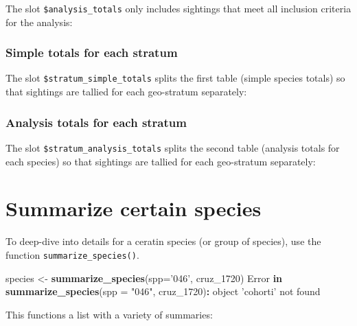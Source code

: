 \documentclass[
]{book}
\newenvironment{Shaded}{\begin{snugshade}}{\end{snugshade}}
\newcommand{\ControlFlowTok}[1]{\textcolor[rgb]{0.13,0.29,0.53}{\textbf{#1}}}
\newcommand{\DataTypeTok}[1]{\textcolor[rgb]{0.13,0.29,0.53}{#1}}
\newcommand{\DecValTok}[1]{\textcolor[rgb]{0.00,0.00,0.81}{#1}}
\newcommand{\KeywordTok}[1]{\textcolor[rgb]{0.13,0.29,0.53}{\textbf{#1}}}
\newcommand{\NormalTok}[1]{#1}
\newcommand{\OperatorTok}[1]{\textcolor[rgb]{0.81,0.36,0.00}{\textbf{#1}}}
\newcommand{\StringTok}[1]{\textcolor[rgb]{0.31,0.60,0.02}{#1}}
\begin{document}
The slot \texttt{\$analysis\_totals} only includes sightings that meet all inclusion criteria for the analysis:

\hypertarget{simple-totals-for-each-stratum}{%
\subsubsection*{Simple totals for each stratum}\label{simple-totals-for-each-stratum}}

The slot \texttt{\$stratum\_simple\_totals} splits the first table (simple species totals) so that sightings are tallied for each geo-stratum separately:

\hypertarget{analysis-totals-for-each-stratum}{%
\subsubsection*{Analysis totals for each stratum}\label{analysis-totals-for-each-stratum}}

The slot \texttt{\$stratum\_analysis\_totals} splits the second table (analysis totals for each species) so that sightings are tallied for each geo-stratum separately:

\hypertarget{summarize-certain-species}{%
\section*{Summarize certain species}\label{summarize-certain-species}}

To deep-dive into details for a ceratin species (or group of species), use the function \texttt{summarize\_species()}.

\begin{Shaded}
\begin{Highlighting}[]
\NormalTok{species <-}\StringTok{ }\KeywordTok{summarize_species}\NormalTok{(}\DataTypeTok{spp=}\StringTok{'046'}\NormalTok{, cruz_}\DecValTok{1720}\NormalTok{)}
\NormalTok{Error }\ControlFlowTok{in} \KeywordTok{summarize_species}\NormalTok{(}\DataTypeTok{spp =} \StringTok{"046"}\NormalTok{, cruz_}\DecValTok{1720}\NormalTok{)}\OperatorTok{:}\StringTok{ }\NormalTok{object }\StringTok{'cohorti'}\NormalTok{ not found}
\end{Highlighting}
\end{Shaded}

This functions a list with a variety of summaries:
\end{document}
